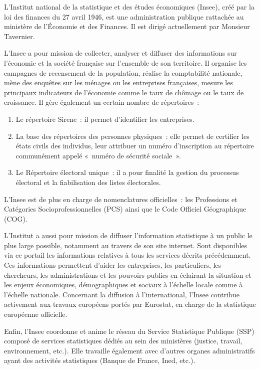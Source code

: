 L'Institut national de la statistique et des études économiques (Insee), créé par la loi des finances du 27 avril 1946, est une administration publique rattachée au ministère de l'Économie et des Finances. Il est dirigé actuellement par Monsieur Tavernier.
\newline

L'Insee a pour mission de collecter, analyser et diffuser des informations sur l'économie et la société française sur l'ensemble de son territoire. Il organise les campagnes de recensement de la population, réalise la comptabilité nationale, mène des enquêtes sur les ménages ou les entreprises françaises, mesure les principaux indicateurs de l'économie comme le taux de chômage ou le taux de croissance. Il gère également un certain nombre de répertoires~:
\begin{enumerate}
    \item Le répertoire Sirene~: il permet d'identifier les entreprises.
    \item La base des répertoires des personnes physiques~: elle permet de certifier les états civils des individus, leur attribuer un numéro d'inscription au répertoire communément appelé «~numéro de sécurité sociale~».
    \item Le Répertoire électoral unique~: il a pour finalité la gestion du processus électoral et la fiabilisation des listes électorales.
\end{enumerate}

L'Insee est de plus en charge de nomenclatures officielles~: les Professions et Catégories Socioprofessionnelles (PCS) ainsi que le Code Officiel Géographique (COG).
\newline

L'Institut a aussi pour mission de diffuser l'information statistique à un public le plus large possible, notamment au travers de son site internet. Sont disponibles via ce portail les informations relatives à tous les services décrits précédemment. Ces informations permettent d'aider les entreprises, les particuliers, les chercheurs, les administrations et les pouvoirs publics en éclairant la situation et les enjeux économiques, démographiques et sociaux à l'échelle locale comme à l'échelle nationale. Concernant la diffusion à l'international, l'Insee contribue activement aux travaux européens portés par Eurostat, en charge de la statistique européenne officielle.
\newline

Enfin, l’Insee coordonne et anime le réseau du Service Statistique Publique (SSP) composé de services statistiques dédiés au sein des ministères (justice, travail, environnement, etc.). Elle travaille également avec d’autres organes administratifs ayant des activités statistiques (Banque de France, Ined, etc.).
\newline

